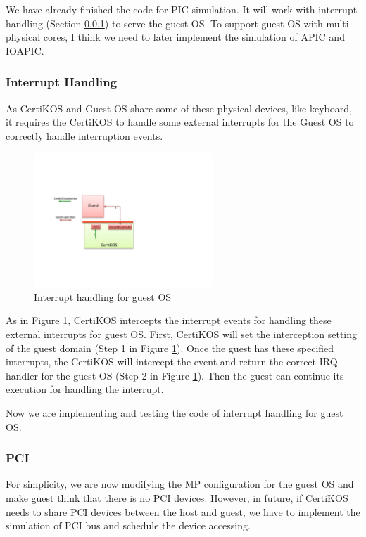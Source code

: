\documentclass[a4paper,12pt]{article}
\begin{document}
We have already finished the code for PIC simulation.  It will work with interrupt handling (Section \ref{subsec:interrupthandling}) to serve the guest OS.
To support guest OS with multi physical cores, I think we need to later implement the simulation of APIC and IOAPIC.

\subsubsection{Interrupt Handling}
\label{subsec:interrupthandling}
As CertiKOS and Guest OS share some of these physical devices, like keyboard, it requires the CertiKOS to handle some external interrupts for the Guest OS to correctly handle interruption events.   
  
  \begin{figure}[!ht]
 \centerline{
 \includegraphics[width=0.6\textwidth]{interrupt_handle}}
 \caption{Interrupt handling for guest OS} \label{fig:interrupthandle}
\end{figure}
As in Figure \ref{fig:interrupthandle}, CertiKOS intercepts the interrupt events for handling these external interrupts for guest OS.   First, CertiKOS will set the interception setting of the guest domain (Step 1 in Figure \ref{fig:interrupthandle}).  Once the guest has these specified interrupts, the CertiKOS will intercept the event and return the correct IRQ handler for the guest OS (Step 2 in Figure \ref{fig:interrupthandle}). Then the guest can continue its execution for handling the interrupt.

Now we are implementing and testing  the code of interrupt handling for guest OS. 

\subsubsection{PCI}
For simplicity, we are now modifying the MP configuration for the guest OS and make guest think that there is no PCI devices. 
However, in future, if CertiKOS needs to share PCI devices between the host and guest, we have to implement the simulation of PCI bus and schedule the device accessing. 
\end{document}
